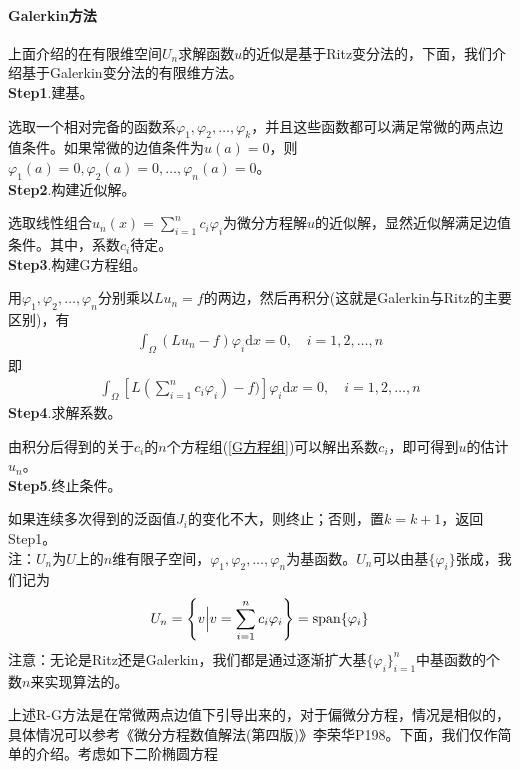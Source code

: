         \paragraph{Galerkin方法}上面介绍的在有限维空间$U_n$求解函数$u$的近似是基于Ritz变分法的，下面，我们介绍基于Galerkin变分法的有限维方法。\\
        \textbf{Step1}.建基。\par
        选取一个相对完备的函数系$\varphi_1,\varphi_2,\dots,\varphi_k$，并且这些函数都可以满足常微的两点边值条件。如果常微的边值条件为$u(a) = 0$，则$\varphi_1(a) = 0,\varphi_2(a) = 0,\dots,\varphi_n(a) = 0$。\\
        \textbf{Step2}.构建近似解。\par
        选取线性组合$u_n(x) = \sum\limits_{i = 1}^n c_i\varphi_i$为微分方程解$u$的近似解，显然近似解满足边值条件。其中，系数$c_i$待定。\\
        \textbf{Step3}.构建G方程组。\par
        用$\varphi_1,\varphi_2,\dots,\varphi_n$分别乘以$Lu_n = f$的两边，然后再积分(这就是Galerkin与Ritz的主要区别)，有
        \begin{align*}
            \int_\Omega (Lu_n - f) \varphi_i \mathrm{d}x = 0,\quad i = 1,2, \dots ,n
        \end{align*}
        即
        \begin{align}
            \label{G方程组}
            \int_\Omega \left [L(\sum_{i = 1}^n c_i \varphi_i) - f)\right ] \varphi_i \mathrm{d}x = 0,\quad i = 1,2, \dots ,n
        \end{align}
        \textbf{Step4}.求解系数。\par
        由积分后得到的关于$c_i$的$n$个方程组(\ref{G方程组})可以解出系数$c_i$，即可得到$u$的估计$u_n$。\\
        \textbf{Step5}.终止条件。\par
        如果连续多次得到的泛函值$J_i$的变化不大，则终止；否则，置$k = k+1$，返回Step1。\\
        注：$U_n$为$U$上的$n$维有限子空间，$\varphi_1,\varphi_2,\dots,\varphi_n$为基函数。$U_n$可以由基$\{\varphi_i\}$张成，我们记为
        \[
            U_n = \left\{v\Bigl| v = \sum _{i =1}^n c_i \varphi_i\right\} = \mathrm{span} \{\varphi_i\}
        \]
        注意：无论是Ritz还是Galerkin，我们都是通过逐渐扩大基$\{\varphi_i\}_{i =1}^n$中基函数的个数$n$来实现算法的。
        \par
        上述R-G方法是在常微两点边值下引导出来的，对于偏微分方程，情况是相似的，具体情况可以参考《微分方程数值解法(第四版)》李荣华P198。下面，我们仅作简单的介绍。考虑如下二阶椭圆方程
